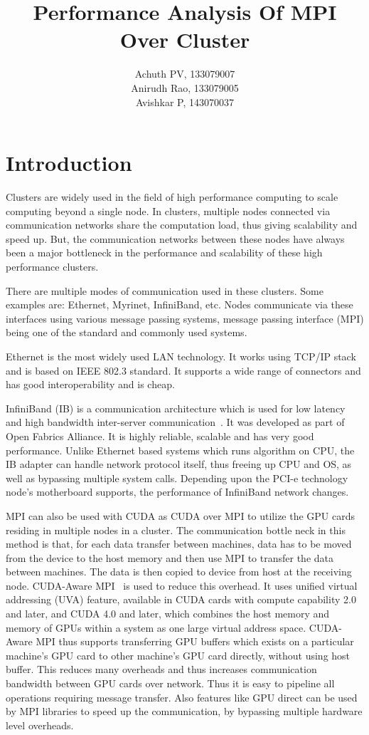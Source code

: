 \documentclass[10pt]{article}
\title{\textbf{Performance Analysis Of MPI Over Cluster}}
\author{Achuth PV, 133079007\\
		Anirudh Rao, 133079005\\
		Avishkar P, 143070037}
\date{}
\begin{document}
\maketitle

\section{Introduction}

Clusters are widely used in the field of high performance computing to scale  computing beyond a single node. In  clusters, multiple nodes connected via communication networks share the computation load, thus giving scalability and speed up. But, the communication networks between these nodes have always been a major bottleneck in the performance and scalability of these high performance clusters.

There are multiple modes of communication used in these clusters. Some examples are: Ethernet, Myrinet, InfiniBand, etc. Nodes communicate via these interfaces using various message passing systems, message passing interface (MPI) being one of the standard and commonly used systems.

Ethernet is the most widely used LAN technology. It works using TCP/IP stack and  is based on IEEE 802.3 standard. It supports a wide range of connectors and has good interoperability and is cheap. 

InfiniBand (IB) is a communication architecture which is used for low latency and high bandwidth inter-server communication~\cite{pfister2001introduction}. It was developed as part of Open Fabrics Alliance. It is highly reliable, scalable and has very good performance. Unlike Ethernet based systems which runs algorithm on CPU, the IB adapter can handle network protocol itself, thus freeing up CPU and OS, as well as bypassing multiple system calls. Depending upon the PCI-e technology node's motherboard supports, the performance of InfiniBand network changes. 

MPI can also be used with CUDA as CUDA over MPI to utilize the GPU cards residing in multiple nodes in a cluster. The communication bottle neck in this method is that, for each data transfer between machines, data has to be moved from the device to the host memory and then use MPI to transfer the data between machines. The data is then copied to device from host at the receiving node. CUDA-Aware MPI~\cite{cudaaware,cheng2014professional} is used to reduce this overhead. It uses unified virtual addressing (UVA) feature, available in CUDA cards with compute capability 2.0 and later, and CUDA 4.0 and later, which combines the host memory and memory of GPUs within a system as one large virtual address space. CUDA-Aware MPI thus supports transferring GPU buffers which exists on a particular machine's GPU card to other machine's GPU card directly, without using host buffer. This reduces many overheads and thus increases communication bandwidth between GPU cards over network. Thus it is easy to pipeline all operations requiring message transfer. Also features like GPU direct can be used by MPI libraries to speed up the communication, by bypassing multiple hardware level overheads. 
\end{document}
